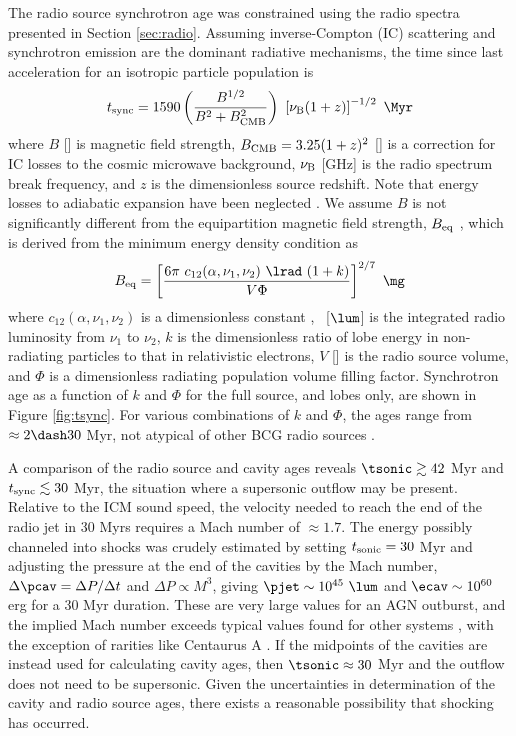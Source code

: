 \documentclass[useAMS,usenatbib]{mn2e}
\begin{document}
The radio source synchrotron age was constrained using the radio
spectra presented in Section \ref{sec:radio}. Assuming inverse-Compton
(IC) scattering and synchrotron emission are the dominant radiative
mechanisms, the time since last acceleration for an isotropic particle
population is \citep{2001AJ....122.1172S}
\begin{equation}
  \tsync = 1590 \left(\frac{B^{1/2}}{B^2 + B_{\rm{CMB}}^2}\right)~
  \left[\nu_{\rm{B}} (1+z)\right]^{-1/2} ~\Myr
\end{equation}
where $B$ [\mg] is magnetic field strength, $B_{\rm{CMB}} =
3.25(1+z)^2$ [\mg] is a correction for IC losses to the cosmic
microwave background, $\nu_{\rm{B}}$ [GHz] is the radio spectrum
break frequency, and $z$ is the dimensionless source redshift. Note
that energy losses to adiabatic expansion have been neglected
\citep{1968ARA&A...6..321S}. We assume $B$ is not significantly
different from the equipartition magnetic field strength,
$B_{\rm{eq}}$ \citep[see][regarding the validity of this
  assumption]{birzan08}, which is derived from the minimum energy
density condition as \citep{1980ARA&A..18..165M}
\begin{equation}
  B_{\rm{eq}} = \left[\frac{6 \pi ~c_{12}(\alpha,\nu_1, \nu_2)
      ~\lrad ~(1+k)}{V \Phi}\right]^{2/7} ~\rm{\mg}
\end{equation}
where $c_{12}(\alpha,\nu_1,\nu_2)$ is a dimensionless constant
\citep{pach}, \lrad\ [$\lum$] is the integrated radio luminosity from
$\nu_1$ to $\nu_2$, $k$ is the dimensionless ratio of lobe energy in
non-radiating particles to that in relativistic electrons, $V$ [\cc]
is the radio source volume, and $\Phi$ is a dimensionless radiating
population volume filling factor. Synchrotron age as a function of $k$
and $\Phi$ for the full source, and lobes only, are shown in Figure
\ref{fig:tsync}. For various combinations of $k$ and $\Phi$, the ages
range from $\approx 2 \dash 30$ Myr, not atypical of other BCG radio
sources \citep[\eg][]{birzan08}.

A comparison of the radio source and cavity ages reveals $\tsonic \ga
42$ Myr and $t_{\rm{sync}} \lesssim 30$ Myr, the situation where a supersonic
outflow may be present. Relative to the ICM sound speed, the velocity
needed to reach the end of the radio jet in 30 Myrs requires a Mach
number of $\approx 1.7$. The energy possibly channeled into shocks was
crudely estimated by setting $t_{\rm{sonic}} = 30$ Myr and adjusting
the pressure at the end of the cavities by the Mach number, $\Delta
\pcav = \Delta P / \Delta t$ and $\Delta P \propto M^3$, giving $\pjet
\sim 10^{45} ~\lum$ and $\ecav \sim 10^{60}$ erg for a 30 Myr
duration. These are very large values for an AGN outburst, and the
implied Mach number exceeds typical values found for other systems
\citep[\eg][]{2005ApJ...635..894F, hydraa}, with the exception of
rarities like Centaurus A \citep{2009MNRAS.395.1999C}. If the
midpoints of the cavities are instead used for calculating cavity
ages, then $\tsonic \approx 30$ Myr and the outflow does not need to
be supersonic. Given the uncertainties in determination of the cavity
and radio source ages, there exists a reasonable possibility that
shocking has occurred.
\end{document}

